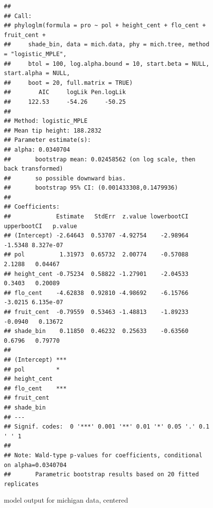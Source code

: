\documentclass{article}\usepackage[]{graphicx}\usepackage[]{color}
\makeatletter
\newenvironment{kframe}{%
 \def\at@end@of@kframe{}%
 \ifinner\ifhmode%
  \def\at@end@of@kframe{\end{minipage}}%
  \begin{minipage}{\columnwidth}%
 \fi\fi%
 \def\FrameCommand##1{\hskip\@totalleftmargin \hskip-\fboxsep
 \colorbox{shadecolor}{##1}\hskip-\fboxsep
     \hskip-\linewidth \hskip-\@totalleftmargin \hskip\columnwidth}%
 \MakeFramed {\advance\hsize-\width
   \@totalleftmargin\z@ \linewidth\hsize
   \@setminipage}}%
 {\par\unskip\endMakeFramed%
 \at@end@of@kframe}
\newenvironment{knitrout}{}{} %
\makeatother
\begin{document}
\begin{figure}[h!]
\begin{knitrout}
\color{fgcolor}\begin{kframe}
\begin{verbatim}
## 
## Call:
## phyloglm(formula = pro ~ pol + height_cent + flo_cent + fruit_cent + 
##     shade_bin, data = mich.data, phy = mich.tree, method = "logistic_MPLE", 
##     btol = 100, log.alpha.bound = 10, start.beta = NULL, start.alpha = NULL, 
##     boot = 20, full.matrix = TRUE)
##        AIC     logLik Pen.logLik 
##     122.53     -54.26     -50.25 
## 
## Method: logistic_MPLE
## Mean tip height: 188.2832
## Parameter estimate(s):
## alpha: 0.0340704 
##       bootstrap mean: 0.02458562 (on log scale, then back transformed)
##       so possible downward bias.
##       bootstrap 95% CI: (0.001433308,0.1479936)
## 
## Coefficients:
##             Estimate   StdErr  z.value lowerbootCI upperbootCI   p.value
## (Intercept) -2.64643  0.53707 -4.92754    -2.98964     -1.5348 8.327e-07
## pol          1.31973  0.65732  2.00774    -0.57088      2.1288   0.04467
## height_cent -0.75234  0.58822 -1.27901    -2.04533      0.3403   0.20089
## flo_cent    -4.62838  0.92810 -4.98692    -6.15766     -3.0215 6.135e-07
## fruit_cent  -0.79559  0.53463 -1.48813    -1.89233     -0.0940   0.13672
## shade_bin    0.11850  0.46232  0.25633    -0.63560      0.6796   0.79770
##                
## (Intercept) ***
## pol         *  
## height_cent    
## flo_cent    ***
## fruit_cent     
## shade_bin      
## ---
## Signif. codes:  0 '***' 0.001 '**' 0.01 '*' 0.05 '.' 0.1 ' ' 1
## 
## Note: Wald-type p-values for coefficients, conditional on alpha=0.0340704
##       Parametric bootstrap results based on 20 fitted replicates
\end{verbatim}
\end{kframe}
\end{knitrout}
\caption{model output for michigan data, centered}
\end{figure}
\end{document}
